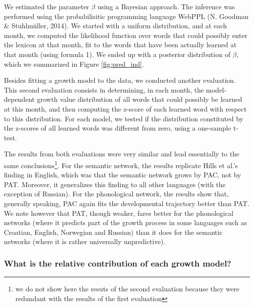 \documentclass[10pt, letterpaper]{article}
\begin{document}
We estimated the parameter \(\beta\) using a Bayesian approach. The
inference was performed using the probabilisitic programming language
WebPPL (N. Goodman \& Stuhlmüller, 2014). We started with a uniform
distribution, and at each month, we computed the likelihood function
over words that could possibly enter the lexicon at that month, fit to
the words that have been actually learned at that month (using formula
1). We ended up with a posterior distribution of \(\beta\), which we
summarized in Figure \ref{fig:pred_ind}.

Besides fitting a growth model to the data, we conducted another
evaluation. This second evaluation consists in determining, in each
month, the model-dependent growth value distribution of all words that
could possibly be learned at this month, and then computing the z-score
of each learned word with respect to this distribution. For each model,
we tested if the distribution constituted by the z-scores of all learned
words was different from zero, using a one-sample t-test.

The results from both evaluations were very similar and lead essentially
to the same
conclusions\footnote{we do not show here the resuts of the second evaluation because they were redundant with the results of the first evaluation}.
For the semantic network, the results replicate Hills et al.'s finding
in English, which was that the semantic network grows by PAC, not by
PAT. Moreover, it generalizes this finding to all other languages (with
the exception of Russian). For the phonological network, the results
show that, generally speaking, PAC again fits the developmental
trajectory better than PAT. We note however that PAT, though weaker,
fares better for the phonological networks (where it predicts part of
the growth process in some languages such as Croatian, English,
Norwegian and Russian) than it does for the semantic networks (where it
is rather universally unpredictive).

\subsubsection{What is the relative contribution of each growth
model?}\label{what-is-the-relative-contribution-of-each-growth-model}
\end{document}
